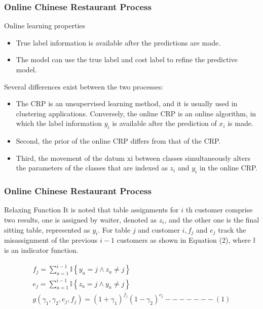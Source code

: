\documentclass[11pt]{beamer}
\begin{document}
	
	\begin{frame}
		\frametitle{Online Chinese Restaurant Process }
\begin{block}{Online learning properties}
\begin{itemize}
	\item True label information is available after the predictions are made.
	\item The model can use the true label and cost label to refine the predictive model.
\end{itemize}
\end{block}	

Several differences exist between the
two processes: 
\begin{itemize}
	\item The CRP is an unsupervised learning
	method, and it is usually used in clustering applications. Conversely, the online CRP is an online algorithm, in which
	the label information $y_i$ is available after the prediction of
	$x_i$ is made.
	\item Second, the prior of the online CRP differs
	from that of the CRP.
	\item  Third, the movement of the datum
	xi between classes simultaneously alters the parameters of
	the classes that are indexed as $z_i$ and $y_i$ in the online CRP.
\end{itemize}

	\end{frame}
	\begin{frame}
		\frametitle{Online Chinese Restaurant Process}
		\begin{block}{Relaxing Function}
		 It is noted that table assignments for $i$ th customer comprise two results, one is assigned by waiter, denoted as $z_i$, and the other one is the final sitting table, represented as $y_i$. For table $j$ and customer $i, f_j$ and $e_j$ track the misassignment of the previous $i-1$ customers as shown in Equation (2), where $\mathbb{I}$ is an indicator function.
		\end{block}
	
	$$
	\begin{gathered}
		f_j=\sum_{a=1}^{i-1} \mathbb{I}\left\{y_a=j \wedge z_a \neq j\right\} \\
		e_j=\sum_{a=1}^{i-1} \mathbb{I}\left\{z_a=j \wedge y_a \neq j\right\} \\
		g\left(\gamma_1, \gamma_2, e_j, f_j\right)=\left(1+\gamma_1\right)^{f_j}\left(1-\gamma_2\right)^{c_j}-------(1)
	\end{gathered}
	$$
	

	\end{frame}
\end{document}
